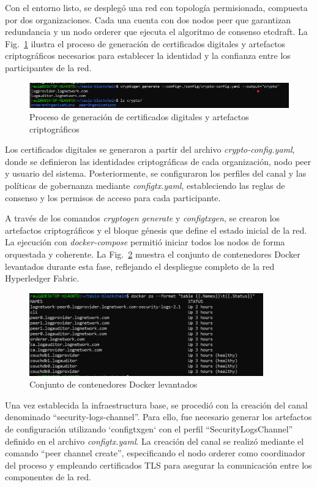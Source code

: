 Con el entorno listo, se desplegó una red con topología permisionada, compuesta por dos organizaciones. Cada una cuenta con dos nodos peer que garantizan redundancia y un nodo orderer que ejecuta el algoritmo de consenso etcdraft. La Fig.~\ref{fig:certificados} ilustra el proceso de generación de certificados digitales y artefactos criptográficos necesarios para establecer la identidad y la confianza entre los participantes de la red.
\begin{figure}[H]
\centering
\includegraphics[width=1\textwidth]{figuras/generacion_certificados.png}
\caption{Proceso de generación de certificados digitales y artefactos criptográficos}
\label{fig:certificados}
\end{figure}

Los certificados digitales se generaron a partir del archivo \textit{crypto-config.yaml}, donde se definieron las identidades criptográficas de cada organización, nodo peer y usuario del sistema. Posteriormente, se configuraron los perfiles del canal y las políticas de gobernanza mediante \textit{configtx.yaml}, estableciendo las reglas de consenso y los permisos de acceso para cada participante.

A través de los comandos \textit{cryptogen generate} y \textit{configtxgen}, se crearon los artefactos criptográficos y el bloque génesis que define el estado inicial de la red. La ejecución con \textit{docker-compose} permitió iniciar todos los nodos de forma orquestada y coherente. La Fig.~\ref{fig:despliegue-red} muestra el conjunto de contenedores Docker levantados durante esta fase, reflejando el despliegue completo de la red Hyperledger Fabric.
\begin{figure}[H]
\centering
\includegraphics[width=0.90\textwidth]{figuras/despliegue_red_fabric.png}
\caption{Conjunto de contenedores Docker levantados}
\label{fig:despliegue-red}
\end{figure}
Una vez establecida la infraestructura base, se procedió con la creación del canal denominado “security-logs-channel”. Para ello, fue necesario generar los artefactos de configuración utilizando `configtxgen` con el perfil “SecurityLogsChannel” definido en el archivo \textit{configtx.yaml}. La creación del canal se realizó mediante el comando “peer channel create”, especificando el nodo orderer como coordinador del proceso y empleando certificados TLS para asegurar la comunicación entre los componentes de la red.

